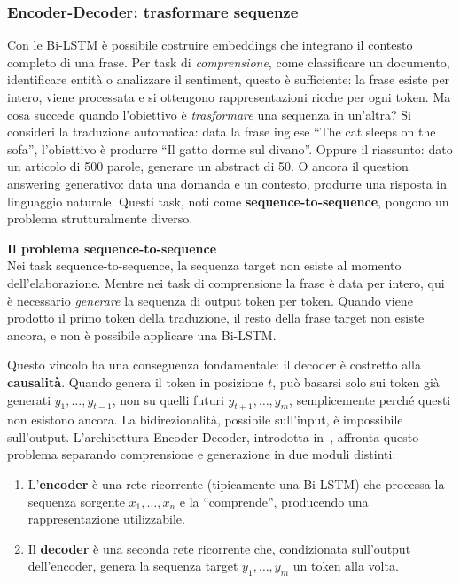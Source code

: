 \subsubsection{Encoder-Decoder: trasformare sequenze}
\label{subsubsec:encoder_decoder}
Con le Bi-LSTM è possibile costruire embeddings che integrano il contesto completo di una frase. Per task di \textit{comprensione}, come classificare un documento, identificare entità o analizzare il sentiment, questo è sufficiente: la frase esiste per intero, viene processata e si ottengono rappresentazioni ricche per ogni token.
Ma cosa succede quando l'obiettivo è \textit{trasformare} una sequenza in un'altra? Si consideri la traduzione automatica: data la frase inglese ``The cat sleeps on the sofa'', l'obiettivo è produrre ``Il gatto dorme sul divano''. Oppure il riassunto: dato un articolo di 500 parole, generare un abstract di 50. O ancora il question answering generativo: data una domanda e un contesto, produrre una risposta in linguaggio naturale.
Questi task, noti come \textbf{sequence-to-sequence}, pongono un problema strutturalmente diverso.
\begin{notebox}
\textbf{Il problema sequence-to-sequence}\\
Nei task sequence-to-sequence, la sequenza target non esiste al momento dell'elaborazione. Mentre nei task di comprensione la frase è data per intero, qui è necessario \textit{generare} la sequenza di output token per token. Quando viene prodotto il primo token della traduzione, il resto della frase target non esiste ancora, e non è possibile applicare una Bi-LSTM.
\end{notebox}
Questo vincolo ha una conseguenza fondamentale: il decoder è costretto alla \textbf{causalità}. Quando genera il token in posizione $t$, può basarsi solo sui token già generati $y_1, \dots, y_{t-1}$, non su quelli futuri $y_{t+1}, \dots, y_m$, semplicemente perché questi non esistono ancora. La bidirezionalità, possibile sull'input, è impossibile sull'output.
L'architettura Encoder-Decoder, introdotta in~\parencite{sutskever2014sequence}, affronta questo problema separando comprensione e generazione in due moduli distinti:
\begin{enumerate}
    \item L'\textbf{encoder} è una rete ricorrente (tipicamente una Bi-LSTM) che processa la sequenza sorgente $x_1, \dots, x_n$ e la ``comprende'', producendo una rappresentazione utilizzabile.
    \item Il \textbf{decoder} è una seconda rete ricorrente che, condizionata sull'output dell'encoder, genera la sequenza target $y_1, \dots, y_m$ un token alla volta.
\end{enumerate}
